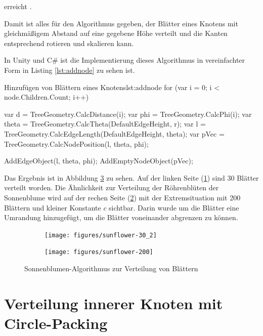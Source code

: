 \noindent erreicht \cite{wolfram2017spherical}.

Damit ist alles für den Algorithmus gegeben, der Blätter eines Knotens mit gleichmäßigem Abstand auf eine gegebene Höhe verteilt und die Kanten entsprechend rotieren und skalieren kann.

In Unity und C\# ist die Implementierung dieses Algorithmus in vereinfachter Form in Listing \ref{lst:addnode} zu sehen ist.

\begin{codesnippet}{Hinzufügen von Blättern eines Knotens}{lst:addnode}
for (var i = 0; i < node.Children.Count; i++)
{
    var d = TreeGeometry.CalcDistance(i);
    var phi = TreeGeometry.CalcPhi(i);
    var theta = TreeGeometry.CalcTheta(DefaultEdgeHeight, r);
    var l = TreeGeometry.CalcEdgeLength(DefaultEdgeHeight, theta);
    var pVec = TreeGeometry.CalcNodePosition(l, theta, phi);

    AddEdgeObject(l, theta, phi);
    AddEmptyNodeObject(pVec);
}
\end{codesnippet}

Das Ergebnis ist in Abbildung \ref{fig:sunflower-algorithm} zu sehen. Auf der linken Seite (\ref{fig:sunflower-30}) sind 30 Blätter verteilt worden. Die Ähnlichkeit zur Verteilung der Röhrenblüten der Sonnenblume wird auf der rechen Seite (\ref{fig:sunflower-200}) mit der Extremsituation mit 200 Blättern und kleiner Konstante $c$ sichtbar. Darin wurde um die Blätter eine Umrandung hinzugefügt, um die Blätter voneinander abgrenzen zu können.

\setlength{\fwidth}{.49\textwidth}
\begin{figure}[htb]
  \centering
  \begin{subfigure}[b]{\fwidth}
   \texttt{[image: figures/sunflower-30\_2]}
    \label{fig:sunflower-30}
  \end{subfigure}
  \hfill
  \begin{subfigure}[b]{\fwidth}
  	\texttt{[image: figures/sunflower-200]}
  	 \label{fig:sunflower-200}
  \end{subfigure}
  \caption{Sonnenblumen-Algorithmus zur Verteilung von Blättern} \label{fig:sunflower-algorithm}
\end{figure}

\section{Verteilung innerer Knoten mit Circle-Packing}
\label{sec:Circle-Packing}

